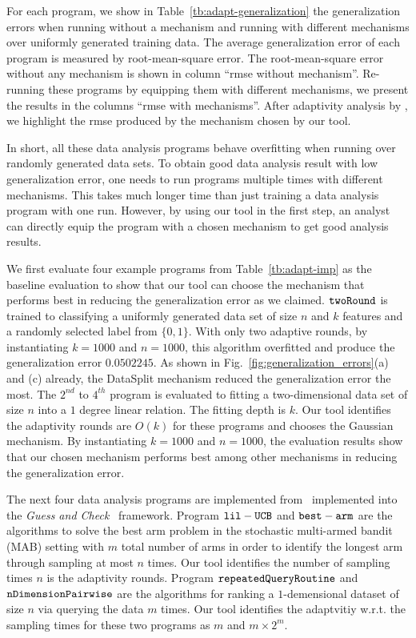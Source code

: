 For each program, we show in Table~\ref{tb:adapt-generalization} the generalization errors when running without a mechanism
and running with different mechanisms over uniformly generated training data.
The average generalization error of each program is measured by root-mean-square error.
The root-mean-square error without any mechanism is shown in column ``rmse without mechanism''.
Re-running these programs by equipping them with different mechanisms, we present the results
in the columns ``rmse with mechanisms''.
After adaptivity analysis by {\THESYSTEM}, we highlight the rmse produced by the mechanism chosen by our tool.

In short, all these data analysis programs behave overfitting when running over randomly generated data sets. 
To obtain good data analysis result with low generalization error,
one needs to run programs multiple times with different mechanisms.
This takes much longer time than just training a data analysis program with one run.
However, by using our tool in the first step, an analyst can directly equip the program with a chosen mechanism to get good
analysis results.


We first evaluate four example programs from Table~\ref{tb:adapt-imp} as the baseline evaluation to show that our tool can choose the mechanism that performs best in reducing the generalization error as we claimed.
$\mathtt{twoRound}$ is trained to classifying a uniformly generated data set of size $n$ and $k$ features and a randomly selected label from $\{0, 1\}$. 
With only two adaptive rounds, by instantiating $k = 1000$ and $n = 1000$, this algorithm overfitted and produce the generalization error 
$0.0502245$. As shown in Fig.~\ref{fig:generalization_errors}(a) and (c) already,
the DataSplit mechanism reduced the generalization error the most.
The $2^{nd}$ to $4^{th}$ program is evaluated to fitting a two-dimensional data set of size $n$ into a $1$ degree linear relation.
The fitting depth is $k$.
Our tool identifies the adaptivity rounds are $O(k)$ for these programs and chooses the Gaussian mechanism.
By instantiating $k = 1000$ and $n = 1000$, the evaluation results show that our chosen mechanism performs best among other mechanisms in reducing the generalization error.

The next four data analysis programs are implemented from~\cite{Jamieson2015TheAO} implemented into the \emph{Guess and Check}~\cite{RogersRSSTW20} framework.
Program $\mathtt{lil-UCB}$ and $\mathtt{best-arm}$ are the algorithms to solve the best arm problem in the stochastic multi-armed bandit (MAB) setting
with $m$ total number of arms in order to identify the longest arm through sampling at most $n$ times.
Our tool identifies the number of sampling times $n$ is the adaptivity rounds.
Program $\mathtt{repeatedQueryRoutine}$ and $\mathtt{nDimensionPairwise}$ are the algorithms for ranking
a $1$-demensional dataset of size $n$ via querying the data $m$ times.
Our tool identifies the adaptvitiy w.r.t. the sampling times for these two programs as $m$ and $m \times 2^m$.

